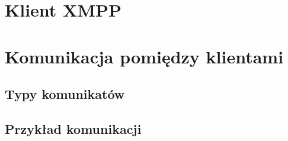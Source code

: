 \documentclass[polish,11pt,a4paper,twoside]{article}
\begin{document}

\section{Klient XMPP}


\section{Komunikacja pomiędzy klientami}

\subsection{Typy komunikatów}


\subsection{Przykład komunikacji}

\end{document}
